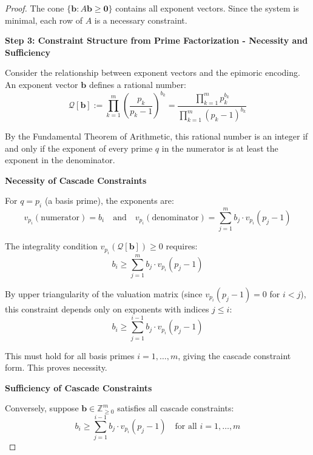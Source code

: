 \begin{proof}
The cone $\{\mathbf{b} : A\mathbf{b} \geq \mathbf{0}\}$ contains all exponent vectors. Since the system is minimal, each row of $A$ is a necessary constraint.

\noindent \textbf{Step 3: Constraint Structure from Prime Factorization - Necessity and Sufficiency}

Consider the relationship between exponent vectors and the epimoric encoding. An exponent vector $\mathbf{b}$ defines a rational number:
\begin{equation}
\mathcal{Q}[\mathbf{b}] := \prod_{k=1}^m \left(\frac{p_k}{p_k - 1}\right)^{b_k} = \frac{\prod_{k=1}^m p_k^{b_k}}{\prod_{k=1}^m (p_k-1)^{b_k}}
\end{equation}

By the Fundamental Theorem of Arithmetic, this rational number is an integer if and only if the exponent of every prime $q$ in the numerator is at least the exponent in the denominator.

\noindent \textbf{Necessity of Cascade Constraints}

For $q = p_i$ (a basis prime), the exponents are:
\begin{equation}
v_{p_i}(\text{numerator}) = b_i \quad \text{and} \quad v_{p_i}(\text{denominator}) = \sum_{j=1}^m b_j \cdot v_{p_i}(p_j - 1)
\end{equation}

The integrality condition $v_{p_i}(\mathcal{Q}[\mathbf{b}]) \geq 0$ requires:
\begin{equation}
b_i \geq \sum_{j=1}^m b_j \cdot v_{p_i}(p_j - 1)
\end{equation}

By upper triangularity of the valuation matrix (since $v_{p_i}(p_j - 1) = 0$ for $i < j$), this constraint depends only on exponents with indices $j \leq i$:
\begin{equation}
b_i \geq \sum_{j=1}^{i-1} b_j \cdot v_{p_i}(p_j - 1)
\end{equation}

This must hold for all basis primes $i = 1, \ldots, m$, giving the cascade constraint form. This proves necessity.

\noindent \textbf{Sufficiency of Cascade Constraints}

Conversely, suppose $\mathbf{b} \in \mathbb{Z}_{\geq 0}^m$ satisfies all cascade constraints:
\begin{equation}
\label{eq:cascade-sufficiency-assumed}
b_i \geq \sum_{j=1}^{i-1} b_j \cdot v_{p_i}(p_j - 1) \quad \text{for all } i = 1, \ldots, m
\end{equation}


\end{proof}
